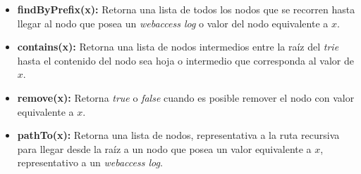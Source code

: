 \begin{itemize}	
	\item \textbf{findByPrefix(x):}  Retorna una lista de todos los nodos 	que se recorren hasta llegar al nodo que posea un \emph{webaccess log} o valor del nodo  equivalente a $x$.
	
	\item \textbf{contains(x):} Retorna una lista de nodos intermedios entre la raíz del \emph{trie} hasta el contenido del nodo sea hoja o intermedio que corresponda al valor de $x$.
	
	\item \textbf{remove(x):} Retorna \emph{true} o \emph{false} cuando es posible remover el nodo con valor equivalente a $x$.
	
	\item \textbf{pathTo(x):} Retorna una lista de nodos, representativa a la ruta recursiva para llegar desde la raíz a un nodo que posea un valor equivalente a $x$, representativo a un \emph{webaccess log}.
\end{itemize}